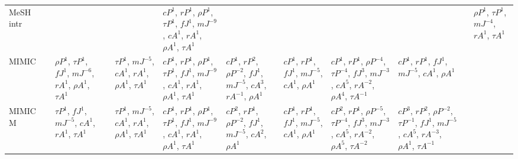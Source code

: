\documentclass[letterpaper]{article} %
\begin{document}
\begin{sidewaystable*}
\begin{tabular}{l l l l l l l l l l l l}
\midrule
\multirow{6}{1.5cm}{MeSH intr} & \multirow{6}{1.5cm}{} & \multirow{6}{1.5cm}{} & \multirow{6}{1.5cm}{} & \multirow{6}{1.5cm}{} & \multirow{6}{1.5cm}{$cP^{1}$, $r P^{1}$, $\rho P^{1}$, $\tau P^{1}$, $fJ^{1}$, $mJ^{-9}$, $cA^{1}$, $r A^{1}$, $\rho A^{1}$, $\tau A^{1}$} & \multirow{6}{1.5cm}{} & \multirow{6}{1.5cm}{} & \multirow{6}{1.5cm}{} & \multirow{6}{1.5cm}{} & \multirow{6}{1.5cm}{} & \multirow{6}{1.5cm}{$\rho P^{1}$, $\tau P^{1}$, $mJ^{-4}$, $r A^{1}$, $\tau A^{1}$} \\ \\ \\ \\ \\ \\
\midrule
\multirow{8}{1.5cm}{MIMIC} & \multirow{8}{1.5cm}{} & \multirow{8}{1.5cm}{$\rho P^{1}$, $\tau P^{1}$, $fJ^{1}$, $mJ^{-6}$, $r A^{1}$, $\rho A^{1}$, $\tau A^{1}$} & \multirow{8}{1.5cm}{} & \multirow{8}{1.5cm}{$\tau P^{1}$, $mJ^{-5}$, $cA^{1}$, $r A^{1}$, $\rho A^{1}$, $\tau A^{1}$} & \multirow{8}{1.5cm}{$cP^{1}$, $r P^{1}$, $\rho P^{1}$, $\tau P^{1}$, $fJ^{1}$, $mJ^{-9}$, $cA^{1}$, $r A^{1}$, $\rho A^{1}$, $\tau A^{1}$} & \multirow{8}{1.5cm}{$cP^{1}$, $r P^{2}$, $\rho P^{-2}$, $fJ^{1}$, $mJ^{-5}$, $cA^{3}$, $r A^{-1}$, $\rho A^{1}$} & \multirow{8}{1.5cm}{$cP^{1}$, $r P^{1}$, $fJ^{1}$, $mJ^{-5}$, $cA^{1}$, $\rho A^{1}$} & \multirow{8}{1.5cm}{$cP^{1}$, $r P^{1}$, $\rho P^{-4}$, $\tau P^{-4}$, $fJ^{3}$, $mJ^{-3}$, $cA^{5}$, $r A^{-2}$, $\rho A^{4}$, $\tau A^{-1}$} & \multirow{8}{1.5cm}{$cP^{1}$, $r P^{1}$, $fJ^{1}$, $mJ^{-5}$, $cA^{1}$, $\rho A^{1}$} & \multirow{8}{1.5cm}{} & \multirow{8}{1.5cm}{} \\ \\ \\ \\ \\ \\ \\ \\
\midrule
\multirow{8}{1.5cm}{MIMIC M} & \multirow{8}{1.5cm}{} & \multirow{8}{1.5cm}{$\tau P^{1}$, $fJ^{1}$, $mJ^{-5}$, $cA^{1}$, $r A^{1}$, $\tau A^{1}$} & \multirow{8}{1.5cm}{} & \multirow{8}{1.5cm}{$\tau P^{1}$, $mJ^{-5}$, $cA^{1}$, $r A^{1}$, $\rho A^{1}$, $\tau A^{1}$} & \multirow{8}{1.5cm}{$cP^{1}$, $r P^{1}$, $\rho P^{1}$, $\tau P^{1}$, $fJ^{1}$, $mJ^{-9}$, $cA^{1}$, $r A^{1}$, $\rho A^{1}$, $\tau A^{1}$} & \multirow{8}{1.5cm}{$cP^{2}$, $r P^{1}$, $\rho P^{-2}$, $fJ^{1}$, $mJ^{-5}$, $cA^{2}$, $\rho A^{1}$} & \multirow{8}{1.5cm}{$cP^{1}$, $r P^{1}$, $fJ^{1}$, $mJ^{-5}$, $cA^{1}$, $\rho A^{1}$} & \multirow{8}{1.5cm}{$cP^{2}$, $r P^{1}$, $\rho P^{-5}$, $\tau P^{-4}$, $fJ^{3}$, $mJ^{-3}$, $cA^{5}$, $r A^{-2}$, $\rho A^{5}$, $\tau A^{-2}$} & \multirow{8}{1.5cm}{$cP^{3}$, $r P^{2}$, $\rho P^{-2}$, $\tau P^{-1}$, $fJ^{1}$, $mJ^{-5}$, $cA^{5}$, $r A^{-3}$, $\rho A^{1}$, $\tau A^{-1}$} & \multirow{8}{1.5cm}{} & \multirow{8}{1.5cm}{} \\ \\ \\ \\ \\ \\ \\ \\

\end{tabular}
\end{sidewaystable*}
\end{document}
